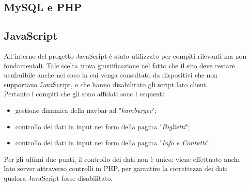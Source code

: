 \subsection{MySQL e PHP}

\subsection{JavaScript}
All'interno del progetto JavaScript è stato utilizzato per compiti rilevanti ma non fondamentali. Tale scelta trova giustificazione nel fatto che il sito deve restare usufruibile anche nel caso in cui venga consultato da dispositivi che non supportano JavaScript, o che hanno disabilitato gli script lato client.\\
Pertanto i compiti che gli sono affidati sono i sequenti:
\begin{itemize}
	\item gestione dinamica della navbar ad "\textit{hamburger}";
	\item controllo dei dati in input nei form della pagina "\textit{Biglietti}";
	\item controllo dei dati in input nei form della pagina "\textit{Info e Contatti}".
\end{itemize}
Per gli ultimi due punti, il controllo dei dati non è unico: viene effettuato anche lato server attraverso controlli in PHP, per garantire la correttezza dei dati qualora JavaScript fosse disabilitato.
